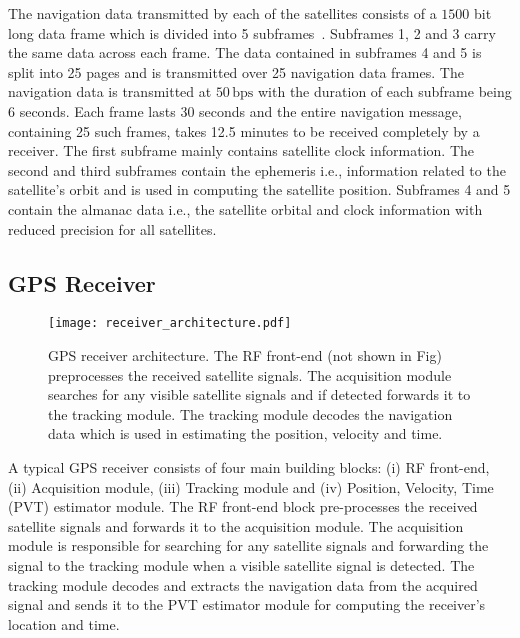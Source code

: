 \documentclass[letterpaper,twocolumn,10pt]{article}
\newcommand{\ie}{i.e.,\xspace}
\newcommand{\unit}[1]{\ensuremath{\, \mathrm{#1}}}
\begin{document}
The navigation data transmitted by each of the satellites consists of a $1500$ bit long data frame which is divided into 5 subframes~\cite{borre2007software}. Subframes 1, 2 and 3 carry the same data across each frame. The data contained in subframes 4 and 5 is split into 25 pages and is transmitted over 25 navigation data frames. The navigation data is transmitted at $50\unit{bps}$ with the duration of each subframe being 6 seconds. Each frame lasts 30 seconds and the entire navigation message, containing 25 such frames, takes 12.5 minutes to be received completely by a receiver. The first subframe mainly contains satellite clock information. The second and third subframes contain the ephemeris \ie information related to the satellite's orbit and is used in computing the satellite position. Subframes 4 and 5 contain the almanac data \ie the satellite orbital and clock information with reduced precision for all satellites. 




\subsection{GPS Receiver}
\label{sub:gps-rx-overview}
\begin{figure}[t]
  \centering
  \texttt{[image: receiver\_architecture.pdf]}
  \caption{GPS receiver architecture. The RF front-end (not shown in Fig) preprocesses the received satellite signals. The acquisition module searches for any visible satellite signals and if detected forwards it to the tracking module. The tracking module decodes the navigation data which is used in estimating the position, velocity and time.}
  \label{fig:gps-rx-architecture}
\end{figure}


A typical GPS receiver consists of four main building blocks: (i) RF front-end, (ii) Acquisition module, (iii) Tracking module and (iv) Position, Velocity, Time (PVT) estimator module. The RF front-end block pre-processes the received satellite signals and forwards it to the acquisition module. The acquisition module is responsible for searching for any satellite signals and forwarding the signal to the tracking module when a visible satellite signal is detected. The tracking module decodes and extracts the navigation data from the acquired signal and sends it to the PVT estimator module for computing the receiver’s location and time.
\end{document}
